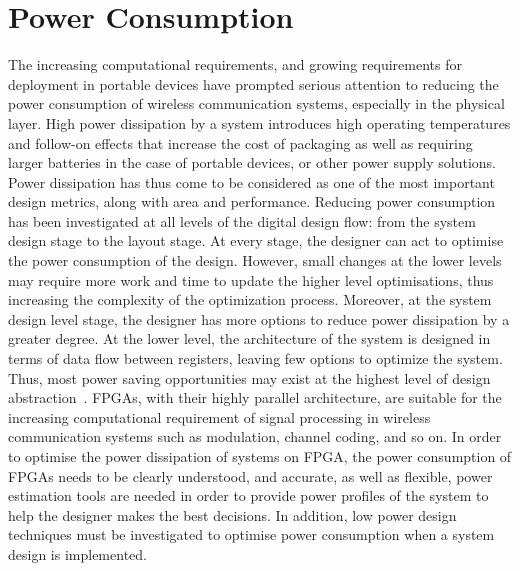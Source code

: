 \section{Power Consumption}
The increasing computational requirements, and growing requirements for deployment in portable devices have prompted serious attention to reducing the power consumption of wireless communication systems, especially in the physical layer. 
High power dissipation by a system introduces high operating temperatures and follow-on effects that increase the cost of packaging as well as requiring larger batteries in the case of portable devices, or other power supply solutions.
Power dissipation has thus come to be considered as one of the most important design metrics, along with area and performance.
Reducing power consumption has been investigated at all levels of the digital design flow: from the system design stage to the layout stage. 
At every stage, the designer can act to optimise the power consumption of the design.
However, small changes at the lower levels may require more work and time to update the higher level optimisations, thus increasing the complexity of the optimization process. 
Moreover, at the system design level stage, the designer has more options to reduce power dissipation by a greater degree.
At the lower level, the architecture of the system is designed in terms of data flow between registers, leaving few options to optimize the system. 
Thus, most power saving opportunities may exist at the highest level of design abstraction~\cite{Raghunathan1998}.
FPGAs, with their highly parallel architecture, are suitable for the increasing computational requirement of signal processing in wireless communication systems such as modulation, channel coding, and so on.
In order to optimise the power dissipation of systems on FPGA, the power consumption of FPGAs needs to be clearly understood, and accurate, as well as flexible, power estimation tools are needed in order to provide power profiles of the system to help the designer makes the best decisions.
In addition, low power design techniques must be investigated to optimise power consumption when a system design is implemented.

